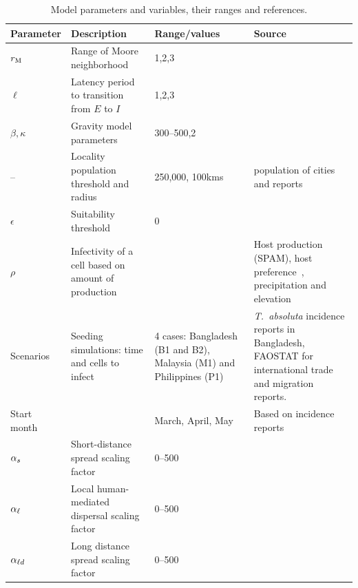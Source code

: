 \documentclass[11pt]{article}
\newcommand{\tuta}{\emph{T.~absoluta}}
\newcommand{\infest}{\rho}
\newcommand{\suitable}{\epsilon}
\theoremstyle{definition}
\begin{document}
\begin{table}[t]
    \caption{Model parameters and variables, their ranges and references.\label{tab:data}}
    \centering
	\small
    \begin{tabular}{l p{4cm} p{3cm} p{5cm}}
		\hline		
		Parameter & Description & Range/values & Source \\
\hline		
\hline
$r_\mathrm{M}$ & Range of Moore neighborhood & 1,2,3 &
\cite{guimapi2016modeling}\\
$\ell$ & Latency period to transition from $E$ to $I$& 1,2,3 & \\
\hline
$\beta, \kappa$ & Gravity model parameters & 300--500,2 &
\cite{venkatramanan2017towards}\\
-- & Locality population threshold and radius & 250,000, 100kms &
population of cities~\cite{citypop} and reports\\
\hline
$\suitable$ & Suitability threshold & 0\\
$\infest$ & Infectivity of a cell based on amount of production & & Host
production (SPAM), host preference~\cite{sylla2018}, precipitation and
elevation \\
\hline
Scenarios & Seeding simulations: time and cells to infect & 4 cases:
Bangladesh (B1 and B2), Malaysia (M1) and Philippines (P1) & \tuta{} incidence
reports in Bangladesh, FAOSTAT for international trade and migration
reports.\\
Start month & & March, April, May & Based on incidence reports\\
\hline
$\alpha_s$ & Short-distance spread scaling factor & 0--500\\
$\alpha_{\ell}$ & Local human-mediated dispersal scaling factor & 0--500\\
$\alpha_{\ell d}$ & Long distance spread scaling factor & 0--500 \\
\hline

\end{tabular}
\end{table}
\end{document}
